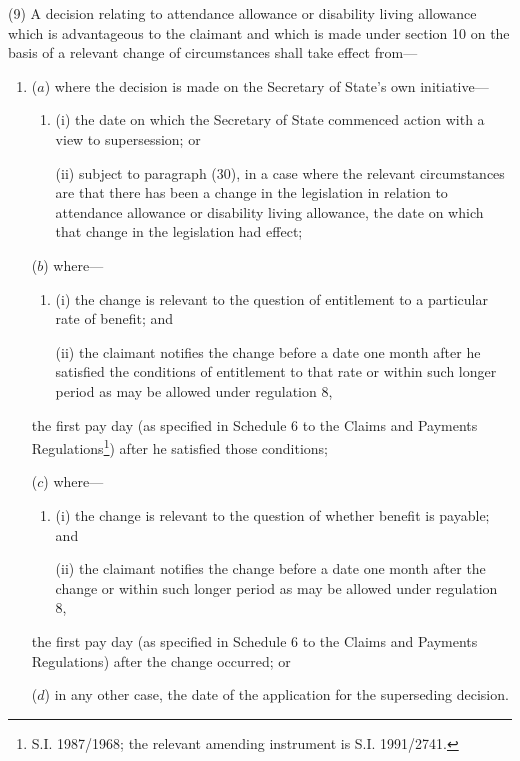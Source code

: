 \documentclass[12pt,a4paper]{article}
\begin{document}
(9) A decision relating to attendance allowance or disability living allowance which is advantageous to the claimant and which is made under section 10 on the basis of a relevant change of circumstances shall take effect from—
\begin{enumerate}\item[]

($a$) where the decision is made on the Secretary of State’s own initiative—
\begin{enumerate}\item[]
(i) the date on which the Secretary of State commenced action with a view to supersession; or

(ii) subject to paragraph (30), in a case where the relevant circumstances are that there has been a change in the legislation in relation to attendance allowance or disability living allowance, the date on which that change in the legislation had effect;
\end{enumerate}

($b$) where—
\begin{enumerate}\item[]
(i) the change is relevant to the question of entitlement to a particular rate of benefit; and

(ii) the claimant notifies the change before a date one month after he satisfied the conditions of entitlement to that rate or within such longer period as may be allowed under regulation 8,
\end{enumerate}
the first pay day (as specified in Schedule 6 to the Claims and Payments Regulations\footnote{\frenchspacing S.I. 1987/1968; the relevant amending instrument is S.I. 1991/2741.}) after he satisfied those conditions;

($c$) where—
\begin{enumerate}\item[]
(i) the change is relevant to the question of whether benefit is payable; and

(ii) the claimant notifies the change before a date one month after the change or within such longer period as may be allowed under regulation 8,
\end{enumerate}
the first pay day (as specified in Schedule 6 to the Claims and Payments Regulations) after the change occurred; or

($d$) in any other case, the date of the application for the superseding decision.
\end{enumerate}
\end{document}

